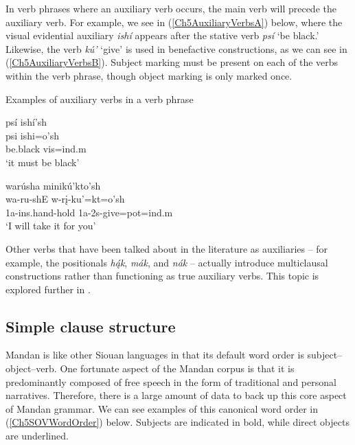In verb phrases where an auxiliary verb occurs, the main verb will precede the auxiliary verb. For example, we see in (\ref{Ch5AuxiliaryVerbsA}) below, where the visual evidential auxiliary \textit{ishí} appears after the stative verb \textit{psí} `be black.' Likewise, the verb \textit{kú'} `give' is used in benefactive constructions, as we can see in (\ref{Ch5AuxiliaryVerbsB}). Subject marking must be present on each of the verbs within the verb phrase, though object marking is only marked once.

\begin{exe}
    \item\label{Ch5AuxiliaryVerbs} Examples of auxiliary verbs in a verb phrase
    \begin{xlist}
        \item\label{Ch5AuxiliaryVerbsA} \glll psí ishí'sh\\
        psi ishi=o'sh\\
        \textnormal{be.black} vis=ind.m\\
        \glt `it must be black' \citep[123]{hollow1973a}

        \item\label{Ch5AuxiliaryVerbsB} \glll warúsha minikú'kto’sh\\
        wa-ru-shE w-rį-ku'=kt=o'sh\\
        1a-ins.hand-\textnormal{hold} 1a-2s-\textnormal{give}=pot=ind.m\\
        \glt `I will take it for you' \citep[307]{hollow1973b}
    \end{xlist}
\end{exe}

Other verbs that have been talked about in the literature as auxiliaries -- for example, the positionals \textit{hą́k}, \textit{mák}, and \textit{nák} -- actually introduce multiclausal constructions rather than functioning as true auxiliary verbs. This topic is explored further in .

\subsection{Simple clause structure}\label{Ch5Clauses}
\largerpage
Mandan is like other Siouan languages in that its default word order is subject--object--verb. One fortunate aspect of the Mandan corpus is that it is predominantly composed of free speech in the form of traditional and personal narratives. Therefore, there is a large amount of data to back up this core aspect of Mandan grammar. We can see examples of this canonical word order in (\ref{Ch5SOVWordOrder}) below. Subjects are indicated in bold, while direct objects are underlined.

